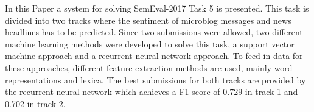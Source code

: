 In this Paper a system for solving SemEval-2017 Task 5 is presented. This task is divided into two tracks where the sentiment of microblog messages and news headlines has to be predicted. Since two submissions were allowed, two different machine learning methods were developed to solve this task, a support vector machine approach and a recurrent neural network approach. To feed in data for these approaches, different feature extraction methods are used, mainly word representations and lexica. The best submissions for both tracks are provided by the recurrent neural network which achieves a F1-score of 0.729 in track 1 and 0.702 in track 2.

